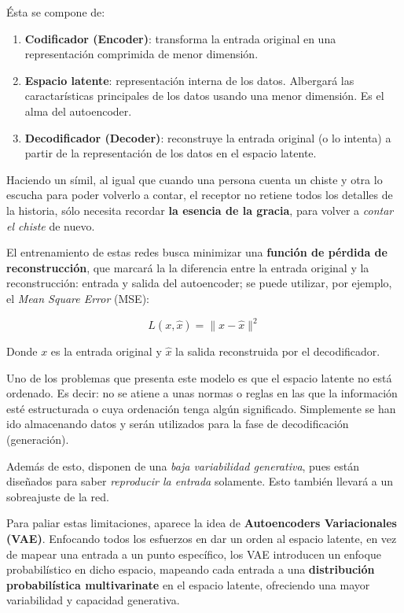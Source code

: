 Ésta se compone de:

\begin{enumerate}
    \item \textbf{Codificador (Encoder)}: transforma la entrada original en una representación comprimida de menor dimensión.
    \item \textbf{Espacio latente}: representación interna de los datos. Albergará las caractarísticas principales de los datos usando una menor dimensión. Es el alma del autoencoder.
    \item \textbf{Decodificador (Decoder)}: reconstruye la entrada original (o lo intenta) a partir de la representación de los datos en el espacio latente.
\end{enumerate}


Haciendo un símil, al igual que cuando una persona cuenta un chiste y otra lo escucha para poder volverlo a contar, el receptor no retiene todos los detalles de la historia, sólo necesita recordar \textbf{la esencia de la gracia}, para volver a \emph{contar el chiste} de nuevo.

El entrenamiento de estas redes busca minimizar una \textbf{función de pérdida de reconstrucción}, que marcará la la diferencia entre la entrada original y la reconstrucción: entrada y salida del autoencoder; se puede utilizar, por ejemplo, el \emph{Mean Square Error} (MSE):

\begin{equation}
    L(x, \hat{x}) = \| x - \hat{x} \|^2
\end{equation}

Donde \( x \) es la entrada original y \( \hat{x} \) la salida reconstruida por el decodificador.

Uno de los problemas que presenta este modelo es que el espacio latente no está ordenado. Es decir: no se atiene a unas normas o reglas en las que la información esté estructurada o cuya ordenación tenga algún significado. Simplemente se han ido almacenando datos y serán utilizados para la fase de decodificación (generación).

Además de esto, disponen de una \emph{baja variabilidad generativa}, pues están diseñados para saber \emph{reproducir la entrada} solamente. Esto también llevará a un sobreajuste de la red.

Para paliar estas limitaciones, aparece la idea de \textbf{Autoencoders Variacionales (VAE)}. Enfocando todos los esfuerzos en dar un orden al espacio latente, en vez de mapear una entrada a un punto específico, los VAE introducen un enfoque probabilístico en dicho espacio, mapeando cada entrada a una \textbf{distribución probabilística \textbf{multivarinate}} en el espacio latente, ofreciendo una mayor variabilidad y capacidad generativa.

